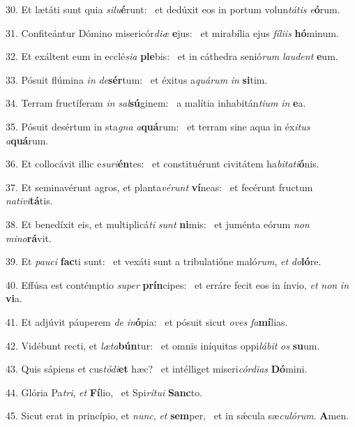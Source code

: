 30. Et lætáti sunt quia \textit{si}\textit{lu}\textbf{é}runt: \ast\  et dedúxit eos in portum volun\textit{tá}\textit{tis} \textit{e}\textbf{ó}rum.\

31. Confiteántur Dómino misericór\textit{di}\textit{æ} \textbf{e}jus: \ast\  et mirabília ejus \textit{fí}\textit{li}\textit{is} \textbf{hó}minum.\

32. Et exáltent eum in ecclé\textit{si}\textit{a} \textbf{ple}bis: \ast\  et in cáthedra senió\textit{rum} \textit{lau}\textit{dent} \textbf{e}um.\

33. Pósuit flúmina \textit{in} \textit{de}\textbf{sér}tum: \ast\  et éxitus a\textit{quá}\textit{rum} \textit{in} \textbf{si}tim.\

34. Terram fructíferam \textit{in} \textit{sal}\textbf{sú}ginem: \ast\  a malítia inhabitán\textit{ti}\textit{um} \textit{in} \textbf{e}a.\

35. Pósuit desértum in sta\textit{gna} \textit{a}\textbf{quá}rum: \ast\  et terram sine aqua in éx\textit{i}\textit{tus} \textit{a}\textbf{quá}rum.\

36. Et collocávit illic e\textit{su}\textit{ri}\textbf{én}tes: \ast\  et constituérunt civitátem ha\textit{bi}\textit{ta}\textit{ti}\textbf{ó}nis.\

37. Et seminavérunt agros, et planta\textit{vé}\textit{runt} \textbf{ví}neas: \ast\  et fecérunt fructum \textit{na}\textit{ti}\textit{vi}\textbf{tá}tis.\

38. Et benedíxit eis, et multiplicá\textit{ti} \textit{sunt} \textbf{ni}mis: \ast\  et juménta eórum \textit{non} \textit{mi}\textit{no}\textbf{rá}vit.\

39. Et \textit{pau}\textit{ci} \textbf{fac}ti sunt: \ast\  et vexáti sunt a tribulatióne maló\textit{rum}, \textit{et} \textit{do}\textbf{ló}re.\

40. Effúsa est contémptio \textit{su}\textit{per} \textbf{prín}cipes: \ast\  et erráre fecit eos in ínvio, \textit{et} \textit{non} \textit{in} \textbf{vi}a.\

41. Et adjúvit páuperem \textit{de} \textit{in}\textbf{ó}pia: \ast\  et pósuit sicut \textit{o}\textit{ves} \textit{fa}\textbf{mí}lias.\

42. Vidébunt recti, et \textit{læ}\textit{ta}\textbf{bún}tur: \ast\  et omnis iníquitas oppi\textit{lá}\textit{bit} \textit{os} \textbf{su}um.\

43. Quis sápiens et cus\textit{tó}\textit{di}\textbf{et} hæc? \ast\  et intélliget miseri\textit{cór}\textit{di}\textit{as} \textbf{Dó}mini.\

44. Glória Pa\textit{tri}, \textit{et} \textbf{Fí}lio, \ast\  et Spi\textit{rí}\textit{tu}\textit{i} \textbf{Sanc}to.\

45. Sicut erat in princípio, et \textit{nunc}, \textit{et} \textbf{sem}per, \ast\  et in sǽcula sæ\textit{cu}\textit{ló}\textit{rum}. \textbf{A}men.\

